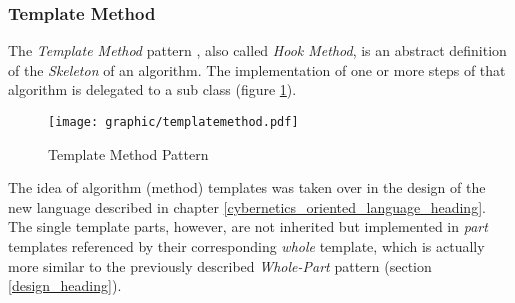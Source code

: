 %
%
%
%
%
%
%

\subsubsection{Template Method}
\label{template_method_heading}

The \emph{Template Method} pattern \cite{gamma1995}, also called
\emph{Hook Method}, is an abstract definition of the \emph{Skeleton} of an
algorithm. The implementation of one or more steps of that algorithm is
delegated to a sub class (figure \ref{templatemethod_figure}).

\begin{figure}[ht]
    \begin{center}
        \texttt{[image: graphic/templatemethod.pdf]}
        \caption{Template Method Pattern}
        \label{templatemethod_figure}
    \end{center}
\end{figure}

The idea of algorithm (method) templates was taken over in the design of the
new language described in chapter \ref{cybernetics_oriented_language_heading}.
The single template parts, however, are not inherited but implemented in
\emph{part} templates referenced by their corresponding \emph{whole} template,
which is actually more similar to the previously described \emph{Whole-Part}
pattern (section \ref{design_heading}).
